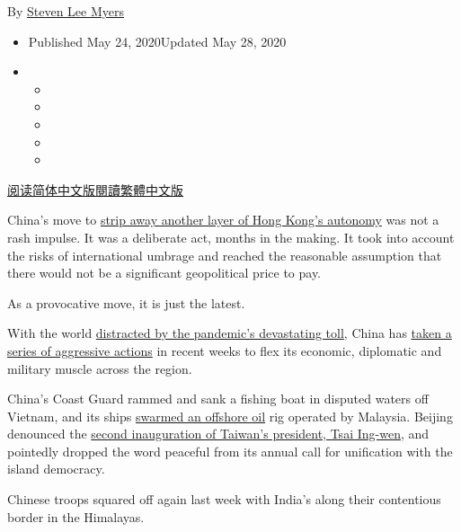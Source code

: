 By \href{https://www.nytimes3xbfgragh.onion/by/steven-lee-myers}{Steven
Lee Myers}

\begin{itemize}
\item
  Published May 24, 2020Updated May 28, 2020
\item
  \begin{itemize}
  \item
  \item
  \item
  \item
  \item
  \end{itemize}
\end{itemize}

\href{https://cn.nytimes3xbfgragh.onion/china/20200525/china-hong-kong-taiwan/}{阅读简体中文版}\href{https://cn.nytimes3xbfgragh.onion/china/20200525/china-hong-kong-taiwan/zh-hant}{閱讀繁體中文版}

China's move to
\href{https://www.nytimes3xbfgragh.onion/2020/05/23/world/asia/hong-kong-china.html}{strip
away another layer of Hong Kong's autonomy} was not a rash impulse. It
was a deliberate act, months in the making. It took into account the
risks of international umbrage and reached the reasonable assumption
that there would not be a significant geopolitical price to pay.

As a provocative move, it is just the latest.

With the world
\href{https://www.nytimes3xbfgragh.onion/2020/05/22/business/china-hong-kong-national-security.html}{distracted
by the pandemic's devastating toll}, China has
\href{https://www.nytimes3xbfgragh.onion/2020/05/21/us/politics/trump-china-hong-kong.html}{taken
a series of aggressive actions} in recent weeks to flex its economic,
diplomatic and military muscle across the region.

China's Coast Guard rammed and sank a fishing boat in disputed waters
off Vietnam, and its ships
\href{https://www.nytimes3xbfgragh.onion/2020/04/21/world/asia/coronavirus-south-china-sea-warships.html}{swarmed
an offshore oil} rig operated by Malaysia. Beijing denounced the
\href{https://www.nytimes3xbfgragh.onion/2016/05/21/world/asia/taiwan-president-tsai-ing-wen.html}{second
inauguration of Taiwan's president, Tsai Ing-wen}, and pointedly dropped
the word peaceful from its annual call for unification with the island
democracy.

Chinese troops squared off again last week with India's along their
contentious border in the Himalayas.

